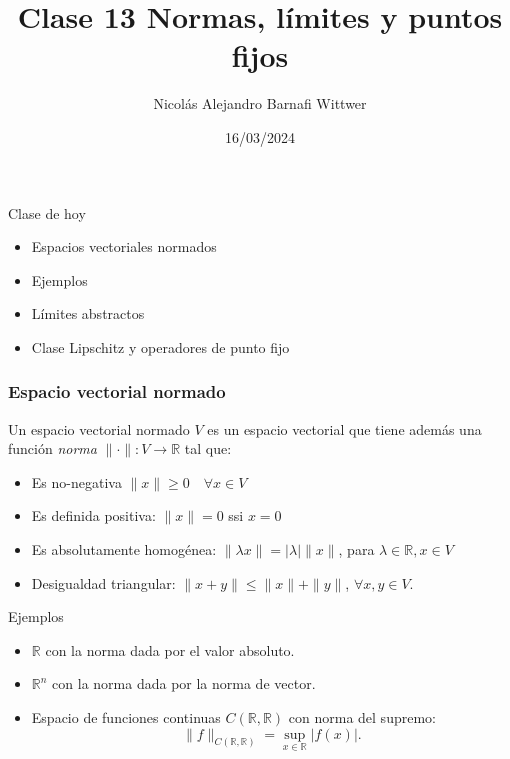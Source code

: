 \documentclass[12pt,aspectratio=169,xcolor=dvipsnames]{beamer}
\title[short title]{Clase 13 Normas, límites y puntos fijos}
\subtitle{}
\author[NA Barnafi] {Nicolás Alejandro Barnafi Wittwer}
\institute[UC|CMM] 
{
    Pontificia Universidad Católica de Chile \\
    Centro de Modelamiento Matemático
}
\date{16/03/2024}
\newcommand{\R}{\mathbb{R}}
\begin{document}
\begin{frame}
    \maketitle
\end{frame}
\begin{frame}{Clase de hoy}
    \begin{itemize}
        \item Espacios vectoriales normados
        \item Ejemplos
        \item Límites abstractos
        \item Clase Lipschitz y operadores de punto fijo
    \end{itemize}

    \vspace{1cm}
\end{frame}
\begin{frame}\frametitle{Espacio vectorial normado}
    Un espacio vectorial normado $V$ es un espacio vectorial que tiene además una función \emph{norma} $\|\cdot\|:V \to \R$ tal que: 
    \begin{itemize}
        \item Es no-negativa $\|x\|\geq 0\quad\forall x \in V$
        \item Es definida positiva: $\|x\|=0$ ssi $x=0$ 
        \item Es absolutamente homogénea: $\|\lambda x\| = |\lambda| \|x\|$, para $\lambda \in \R, x\in V$
        \item Desigualdad triangular: $\|x+y\| \leq \|x\| + \|y \|$, $\forall x,y \in V$. 
    \end{itemize}

\end{frame}
\begin{frame}{Ejemplos}
    \begin{itemize}
        \item $\R$ con la norma dada por el valor absoluto.
        \item $\R^n$ con la norma dada por la norma de vector.
        \item Espacio de funciones continuas $C(\R,\R)$ con norma del supremo: 
            $$ \| f \|_{C(\R,\R)} = \sup_{x\in \R}|f(x)|. $$
    \end{itemize}
\end{frame}
\end{document}
